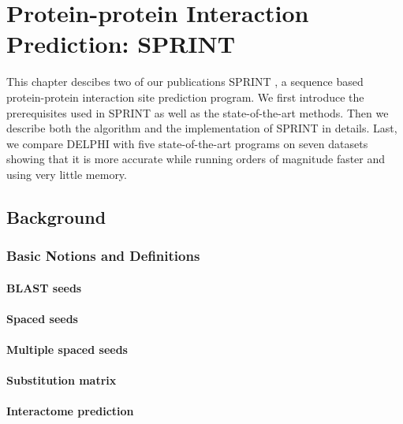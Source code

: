 \chapter{Protein-protein Interaction Prediction: SPRINT}
This chapter descibes two of our publications SPRINT \cite{li2017sprint, li2020predicting}, a sequence based protein-protein interaction site prediction program. We first introduce the prerequisites used in SPRINT as well as the state-of-the-art methods. Then we describe both the algorithm and the implementation of SPRINT in details.  Last, we compare DELPHI with five state-of-the-art programs on seven datasets showing that it is more accurate while running orders of magnitude faster and using very little memory.
\section{Background}
\subsection{Basic Notions and Definitions}
\subsubsection{BLAST seeds}
\subsubsection{Spaced seeds}
\subsubsection{Multiple spaced seeds}
\subsubsection{Substitution matrix}
\subsubsection{Interactome prediction}
